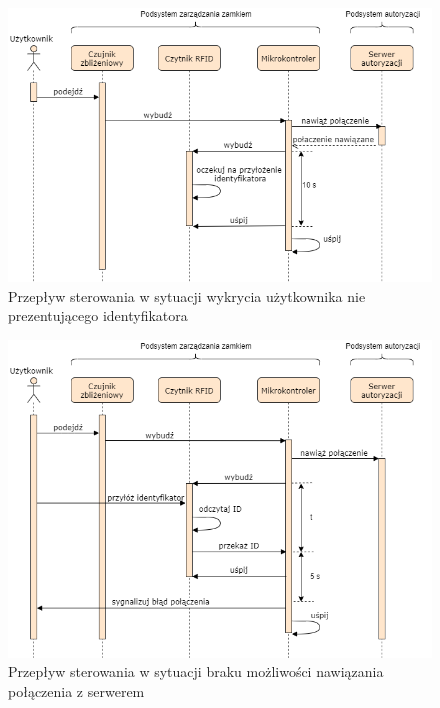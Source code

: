             \begin{figure}[]
                \includegraphics[width=\linewidth]{chapters/images/sequence2.png}
                \caption{Przepływ sterowania w sytuacji wykrycia użytkownika nie prezentującego identyfikatora}
                \label{fig:sequence2}
            \end{figure}

            \begin{figure}[]
                \includegraphics[width=\linewidth]{chapters/images/sequence3.png}
                \caption{Przepływ sterowania w sytuacji braku możliwości nawiązania połączenia z serwerem}
                \label{fig:sequence3}
            \end{figure}

